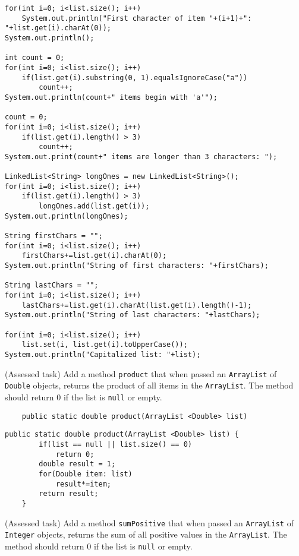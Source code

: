 \begin{questions}
\begin{solution}
\begin{lstlisting}
for(int i=0; i<list.size(); i++)
	System.out.println("First character of item "+(i+1)+": "+list.get(i).charAt(0));
System.out.println();

int count = 0;
for(int i=0; i<list.size(); i++)
	if(list.get(i).substring(0, 1).equalsIgnoreCase("a"))
		count++;
System.out.println(count+" items begin with 'a'");

count = 0;
for(int i=0; i<list.size(); i++)
	if(list.get(i).length() > 3)
		count++;
System.out.print(count+" items are longer than 3 characters: ");

LinkedList<String> longOnes = new LinkedList<String>();
for(int i=0; i<list.size(); i++)
	if(list.get(i).length() > 3)
		longOnes.add(list.get(i));
System.out.println(longOnes);

String firstChars = "";
for(int i=0; i<list.size(); i++)
	firstChars+=list.get(i).charAt(0);
System.out.println("String of first characters: "+firstChars);

String lastChars = "";
for(int i=0; i<list.size(); i++)
	lastChars+=list.get(i).charAt(list.get(i).length()-1);
System.out.println("String of last characters: "+lastChars);

for(int i=0; i<list.size(); i++)
	list.set(i, list.get(i).toUpperCase());
System.out.println("Capitalized list: "+list);
\end{lstlisting}
\end{solution}

\question (Assessed task) Add a method \texttt{product} that when passed an \texttt{ArrayList} of \texttt{Double} objects, returns the product of all items in the \texttt{ArrayList}. The method should return 0 if the list is \texttt{null} or empty.

\begin{lstlisting}
	public static double product(ArrayList <Double> list)
\end{lstlisting}

\begin{solution}
\begin{lstlisting}
public static double product(ArrayList <Double> list) {
		if(list == null || list.size() == 0) 
			return 0;
		double result = 1;
		for(Double item: list)
			result*=item;
		return result;
	}	
\end{lstlisting}	
\end{solution}


\question (Assessed task) Add a method \texttt{sumPositive} that when passed an \texttt{ArrayList} of \texttt{Integer} objects, returns the sum of all positive values in the \texttt{ArrayList}. The method should return 0 if the list is \texttt{null} or empty.


\end{questions}
